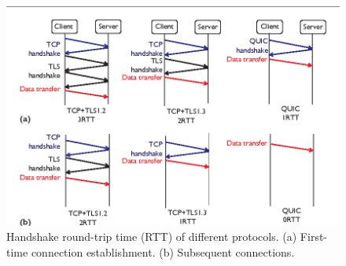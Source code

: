 \begin{frame}
    
    \begin{figure}[!ht]
        
        \includegraphics[width=1\textwidth]
        {figures/0rtt.png}
        \endminipage\hfill
        \caption{\label{fig:RTT} Handshake round-trip time (RTT) of different protocols. (a) First-time connection establishment. (b) Subsequent connections.\cite{Cui2017}}
    \end{figure}

    
    
\end{frame}
\clearpage


